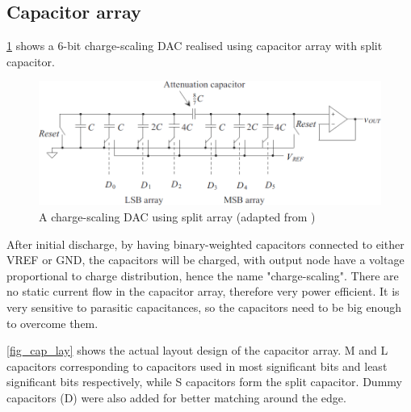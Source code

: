 \documentclass[journal]{IEEEtran}
\newcommand{\fref}[1]{\figurename \ref{#1}}
\begin{document}
\subsection{Capacitor array}

\fref{fig_cap_split} shows a 6-bit charge-scaling DAC realised using capacitor array with split capacitor.


\begin{figure}[!t]
	\centering
	\includegraphics[width=\columnwidth]{cap_split}
	\caption{A charge-scaling DAC using split array (adapted from \cite{cap_dac})}
	\label{fig_cap_split}
\end{figure}

After initial discharge, by having binary-weighted capacitors connected to either VREF or GND, the capacitors will be charged, with output node have a voltage proportional to charge distribution, hence the name "charge-scaling". There are no static current flow in the capacitor array, therefore very power efficient. It is very sensitive to parasitic capacitances, so the capacitors need to be big enough to overcome them.



\fref{fig_cap_lay} shows the actual layout design of the capacitor array. M and L capacitors corresponding to capacitors used in most significant bits and least significant bits respectively, while S capacitors form the split capacitor. Dummy capacitors (D) were also added for better matching around the edge.
\end{document}
